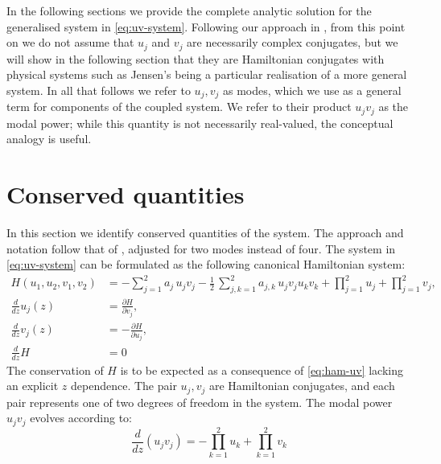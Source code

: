 \documentclass[11pt,a4paper]{article}
\numberwithin{equation}{section}
\begin{document}
In the following sections we provide the complete analytic solution for the generalised system in \eqref{eq:uv-system}.
Following our approach in \cite{heskethCompleteWeierstrassElliptic2026}, from this point on we do not assume that $u_j$ and $v_j$ are necessarily complex conjugates, but we will show in the following section that they are Hamiltonian conjugates with physical systems such as Jensen's being a particular realisation of a more general system.
In all that follows we refer to $u_j, v_j$ as modes, which we use as a general term for components of the coupled system. 
We refer to their product $u_j v_j$ as the modal power; while this quantity is not necessarily real-valued, the conceptual analogy is useful.




\section{Conserved quantities}

In this section we identify conserved quantities of the system. 
The approach and notation follow that of \cite{heskethCompleteWeierstrassElliptic2026}, adjusted for two modes instead of four.
The system in \eqref{eq:uv-system} can be formulated as the following canonical Hamiltonian system:
\begin{align}
\label{eq:ham-uv}
H(u_1, u_2, v_1, v_2) &= -\sum_{j=1}^{2} a_{j}\, u_j v_j - \frac{1}{2}\,\sum_{j,k=1}^{2} a_{j,k}\, u_j v_j u_k v_k + \prod\limits_{j=1}^{2} u_j + \prod\limits_{j=1}^{2} v_j, \\
\frac{d}{d z} u_j{\left(z \right)} &= \frac{\partial H}{\partial v_j}, \\
\frac{d}{d z} v_j{\left(z \right)} &= -\frac{\partial H}{\partial u_j}, \\
\frac{d}{d z} H &= 0
\end{align}
The conservation of $H$ is to be expected as a consequence of \eqref{eq:ham-uv} lacking an explicit $z$ dependence. 
The pair $u_j, v_j$ are Hamiltonian conjugates, and each pair represents one of two degrees of freedom in the system. 
The modal power $u_j v_j$ evolves according to:
\begin{equation}
\label{eq:duv_j} 
\frac{d}{d z}\left(u_j v_j\right) = - \prod\limits_{k=1}^{2} u_k + \prod\limits_{k=1}^{2} v_k
\end{equation}
\end{document}
